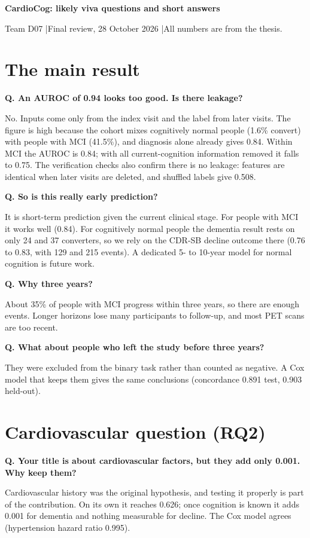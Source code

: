 \documentclass[11pt,a4paper]{article}
\newcommand{\q}[1]{\par\medskip\textbf{Q. #1}\par}
\begin{document}
{\Large\bfseries CardioCog: likely viva questions and short answers\par}
\smallskip
Team D07 \quad|\quad Final review, 28 October 2026 \quad|\quad All numbers are from the thesis.

\section{The main result}

\q{An AUROC of 0.94 looks too good. Is there leakage?}
No. Inputs come only from the index visit and the label from later visits. The figure is high because the cohort mixes cognitively normal people (1.6\% convert) with people with MCI (41.5\%), and diagnosis alone already gives 0.84. Within MCI the AUROC is 0.84; with all current-cognition information removed it falls to 0.75. The verification checks also confirm there is no leakage: features are identical when later visits are deleted, and shuffled labels give 0.508.

\q{So is this really early prediction?}
It is short-term prediction given the current clinical stage. For people with MCI it works well (0.84). For cognitively normal people the dementia result rests on only 24 and 37 converters, so we rely on the CDR-SB decline outcome there (0.76 to 0.83, with 129 and 215 events). A dedicated 5- to 10-year model for normal cognition is future work.

\q{Why three years?}
About 35\% of people with MCI progress within three years, so there are enough events. Longer horizons lose many participants to follow-up, and most PET scans are too recent.

\q{What about people who left the study before three years?}
They were excluded from the binary task rather than counted as negative. A Cox model that keeps them gives the same conclusions (concordance 0.891 test, 0.903 held-out).

\section{Cardiovascular question (RQ2)}

\q{Your title is about cardiovascular factors, but they add only 0.001. Why keep them?}
Cardiovascular history was the original hypothesis, and testing it properly is part of the contribution. On its own it reaches 0.626; once cognition is known it adds 0.001 for dementia and nothing measurable for decline. The Cox model agrees (hypertension hazard ratio 0.995).
\end{document}
